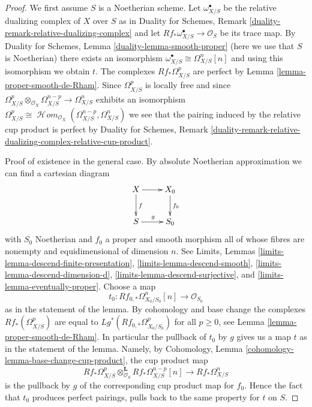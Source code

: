 \documentclass[10pt,a4paper]{amsart}
\theoremstyle{plain}
\theoremstyle{definition}
\theoremstyle{remark}
\numberwithin{equation}{subsection}
\def\SheafHom{\mathop{\mathcal{H}\!\mathit{om}}\nolimits}
\begin{document}
\begin{proof}
We first assume $S$ is a Noetherian scheme.
Let $\omega^\bullet_{X/S}$ be the relative dualizing complex of $X$ over $S$ as
in Duality for Schemes, Remark \ref{duality-remark-relative-dualizing-complex}
and let $Rf_*\omega_{X/S}^\bullet \to \mathcal{O}_S$ be its trace map. By
Duality for Schemes, Lemma \ref{duality-lemma-smooth-proper}
(here we use that $S$ is Noetherian)
there exists an isomorphism $\omega^\bullet_{X/S} \cong \Omega^n_{X/S}[n]$
and using this isomorphism we obtain $t$. The complexes $Rf_*\Omega^p_{X/S}$
are perfect by Lemma \ref{lemma-proper-smooth-de-Rham}.
Since $\Omega^p_{X/S}$ is locally free and since
$\Omega^p_{X/S} \otimes_{\mathcal{O}_X} \Omega^{n - p}_{X/S} \to
\Omega^n_{X/S}$ exhibits an isomorphism $\Omega^p_{X/S} \cong
\SheafHom_{\mathcal{O}_X}(\Omega^{n - p}_{X/S}, \Omega^n_{X/S})$
we see that the pairing induced by the relative cup product is perfect by
Duality for Schemes, Remark
\ref{duality-remark-relative-dualizing-complex-relative-cup-product}.

\medskip\noindent
Proof of existence in the general case.
By absolute Noetherian approximation we can find a cartesian diagram
$$
\xymatrix{
X \ar[r] \ar[d]^f & X_0 \ar[d]^{f_0} \\
S \ar[r]^g & S_0
}
$$
with $S_0$ Noetherian and $f_0$ a proper and smooth morphism
all of whose fibres are nonempty and equidimensional of dimension $n$.
See Limits, Lemmas \ref{limits-lemma-descend-finite-presentation},
\ref{limits-lemma-descend-smooth}, \ref{limits-lemma-descend-dimension-d},
\ref{limits-lemma-descend-surjective}, and
\ref{limits-lemma-eventually-proper}. Choose a map
$$
t_0 : Rf_{0, *}\Omega^n_{X_0/S_0}[n] \longrightarrow \mathcal{O}_{S_0}
$$
as in the statement of the lemma. By cohomology and base change the
complexes $Rf_*(\Omega^p_{X/S})$ are equal to
$Lg^*(Rf_{0, *}\Omega^p_{X_0/S_0})$ for all $p \geq 0$, see
Lemma \ref{lemma-proper-smooth-de-Rham}. In particular the pullback
of $t_0$ by $g$ gives us a map $t$ as in the statement of the lemma.
Namely, by Cohomology, Lemma \ref{cohomology-lemma-base-change-cup-product},
the cup product map
$$
Rf_*\Omega^p_{X/S}
\otimes_{\mathcal{O}_S}^\mathbf{L}
Rf_*\Omega^{n - p}_{X/S}[n]
\longrightarrow
Rf_*\Omega^n_{X/S}
$$
is the pullback by $g$ of the corresponding cup product map for $f_0$.
Hence the fact that $t_0$ produces perfect pairings, pulls back to
the same property for $t$ on $S$.


\end{proof}
\end{document}
